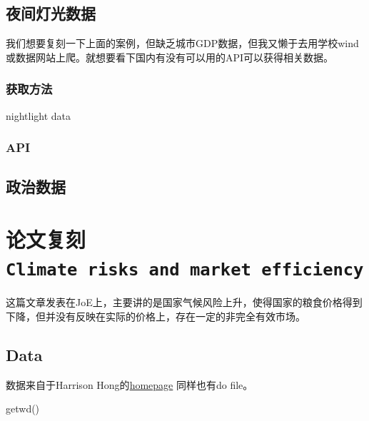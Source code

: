 \documentclass[
  oneside]{book}
\newenvironment{Shaded}{\begin{snugshade}}{\end{snugshade}}
\newcommand{\FunctionTok}[1]{\textcolor[rgb]{0.00,0.00,0.00}{#1}}
\newcommand{\NormalTok}[1]{#1}
\begin{document}
\hypertarget{ux591cux95f4ux706fux5149ux6570ux636e}{%
\section{夜间灯光数据}\label{ux591cux95f4ux706fux5149ux6570ux636e}}

我们想要复刻一下上面的案例，但缺乏城市GDP数据，但我又懒于去用学校wind或数据网站上爬。就想要看下国内有没有可以用的API可以获得相关数据。

\hypertarget{ux83b7ux53d6ux65b9ux6cd5}{%
\subsection{获取方法}\label{ux83b7ux53d6ux65b9ux6cd5}}

nightlight data

\hypertarget{api}{%
\subsection{API}\label{api}}

\hypertarget{ux653fux6cbbux6570ux636e}{%
\section{政治数据}\label{ux653fux6cbbux6570ux636e}}

\hypertarget{ux8bbaux6587ux590dux523bclimate-risks-and-market-efficiency}{%
\chapter{\texorpdfstring{论文复刻\texttt{Climate\ risks\ and\ market\ efficiency}}{论文复刻Climate risks and market efficiency}}\label{ux8bbaux6587ux590dux523bclimate-risks-and-market-efficiency}}

\textcite{Hong2019} 这篇文章发表在JoE上，主要讲的是国家气候风险上升，使得国家的粮食价格得到下降，但并没有反映在实际的价格上，存在一定的非完全有效市场。

\hypertarget{data}{%
\section{Data}\label{data}}

数据来自于Harrison Hong的\href{http://www.columbia.edu/~hh2679/}{homepage} 同样也有do file。

\begin{Shaded}
\begin{Highlighting}[]
\FunctionTok{getwd}\NormalTok{()}
\end{Highlighting}
\end{Shaded}
\end{document}
